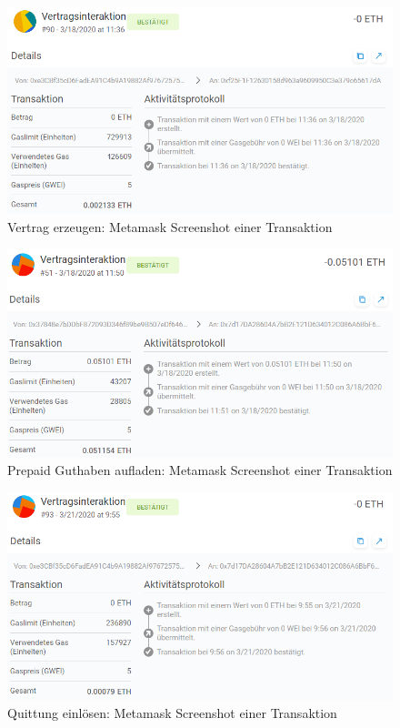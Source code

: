 \begin{figure}[h]
 \centering
 \includegraphics[width=1.0\textwidth]{gfx/screenshots/create_contract.PNG}
 \caption{Vertrag erzeugen: Metamask Screenshot einer Transaktion}
 \label{fig:appendix:costs:create}
\end{figure}

\begin{figure}[h]
 \centering
 \includegraphics[width=1.0\textwidth]{gfx/screenshots/charge_contract.PNG}
 \caption{Prepaid Guthaben aufladen: Metamask Screenshot einer Transaktion}
 \label{fig:appendix:costs:charge}
\end{figure}

\begin{figure}[h]
 \centering
 \includegraphics[width=1.0\textwidth]{gfx/screenshots/redeem.PNG}
 \caption{Quittung einlösen: Metamask Screenshot einer Transaktion}
 \label{fig:appendix:costs:reddeem}
\end{figure}


